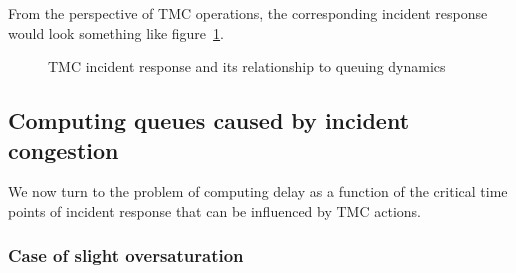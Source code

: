 \documentclass[12pt]{report}
\newcommand{\inputTikZ}[1]{%
  }
\newcommand{\inputTikZ}[1]{%
    \beginpgfgraphicnamed{#1-external}%
    \endpgfgraphicnamed%
  }
\begin{document}
From the perspective of TMC operations, the corresponding incident
response would look something like
figure~\ref{fig:tmc-resp-and-queuing}.
\begin{figure}[tbp]
  \begin{center}
    \inputTikZ{figs/tmc-response-and-queuing}
    \caption{TMC incident response and its relationship to queuing dynamics}
    \label{fig:tmc-resp-and-queuing}
  \end{center}
\end{figure}

\subsection{Computing queues caused by incident congestion}
\label{sec:comp-queues}

We now turn to the problem of computing delay as a function of the
critical time points of incident response that can be influenced by
TMC actions.


\subsubsection*{Case of slight oversaturation}
\end{document}
